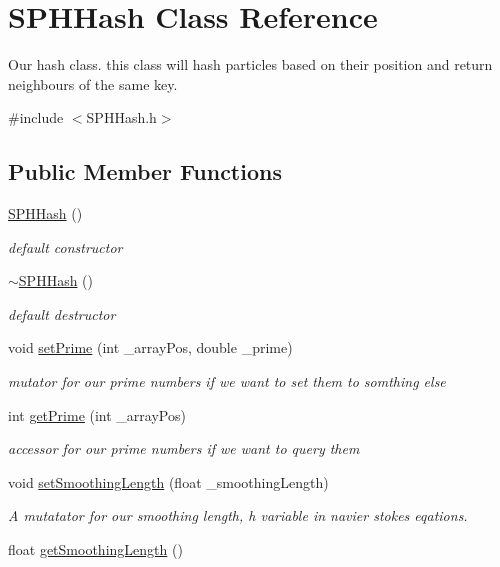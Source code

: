 \hypertarget{classSPHHash}{\section{S\-P\-H\-Hash Class Reference}
\label{classSPHHash}
}


Our hash class. this class will hash particles based on their position and return neighbours of the same key.  




{\ttfamily \#include $<$S\-P\-H\-Hash.\-h$>$}

\subsection*{Public Member Functions}
\begin{DoxyCompactItemize}
\item 
\hypertarget{classSPHHash_a932bc74f4bcb35b889c26264a1b6611f}{\hyperlink{classSPHHash_a932bc74f4bcb35b889c26264a1b6611f}{S\-P\-H\-Hash} ()}\label{classSPHHash_a932bc74f4bcb35b889c26264a1b6611f}

\begin{DoxyCompactList}\small\item\em default constructor \end{DoxyCompactList}\item 
\hypertarget{classSPHHash_a36ee41bd38353aae787b3e21db483bf0}{\hyperlink{classSPHHash_a36ee41bd38353aae787b3e21db483bf0}{$\sim$\-S\-P\-H\-Hash} ()}\label{classSPHHash_a36ee41bd38353aae787b3e21db483bf0}

\begin{DoxyCompactList}\small\item\em default destructor \end{DoxyCompactList}\item 
void \hyperlink{classSPHHash_a7f2a79b0f805eaec59261bcb4c152fe3}{set\-Prime} (int \-\_\-array\-Pos, double \-\_\-prime)
\begin{DoxyCompactList}\small\item\em mutator for our prime numbers if we want to set them to somthing else \end{DoxyCompactList}\item 
int \hyperlink{classSPHHash_a4e9e9732324d78090691c16a826ce0b4}{get\-Prime} (int \-\_\-array\-Pos)
\begin{DoxyCompactList}\small\item\em accessor for our prime numbers if we want to query them \end{DoxyCompactList}\item 
void \hyperlink{classSPHHash_abb619376308257ed514a52af3615ac96}{set\-Smoothing\-Length} (float \-\_\-smoothing\-Length)
\begin{DoxyCompactList}\small\item\em A mutatator for our smoothing length, h variable in navier stokes eqations. \end{DoxyCompactList}\item 
\hypertarget{classSPHHash_ad0de738a768a20c73a532a32aa09b64e}{float \hyperlink{classSPHHash_ad0de738a768a20c73a532a32aa09b64e}{get\-Smoothing\-Length} ()}\label{classSPHHash_ad0de738a768a20c73a532a32aa09b64e}


\end{DoxyCompactItemize}
